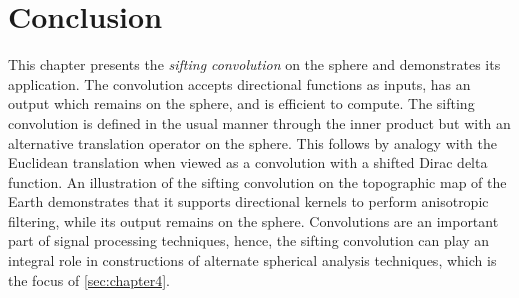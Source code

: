 \section{Conclusion}\label{sec:chapter3_conclusion}

This chapter presents the \emph{sifting convolution} on the sphere and demonstrates its application.
The convolution accepts directional functions as inputs, has an output which remains on the sphere, and is efficient to compute.
The sifting convolution is defined in the usual manner through the inner product but with an alternative translation operator on the sphere.
This follows by analogy with the Euclidean translation when viewed as a convolution with a shifted Dirac delta function.
An illustration of the sifting convolution on the topographic map of the Earth demonstrates that it supports directional kernels to perform anisotropic filtering, while its output remains on the sphere.
Convolutions are an important part of signal processing techniques, hence, the sifting convolution can play an integral role in constructions of alternate spherical analysis techniques, which is the focus of \cref{sec:chapter4}.
